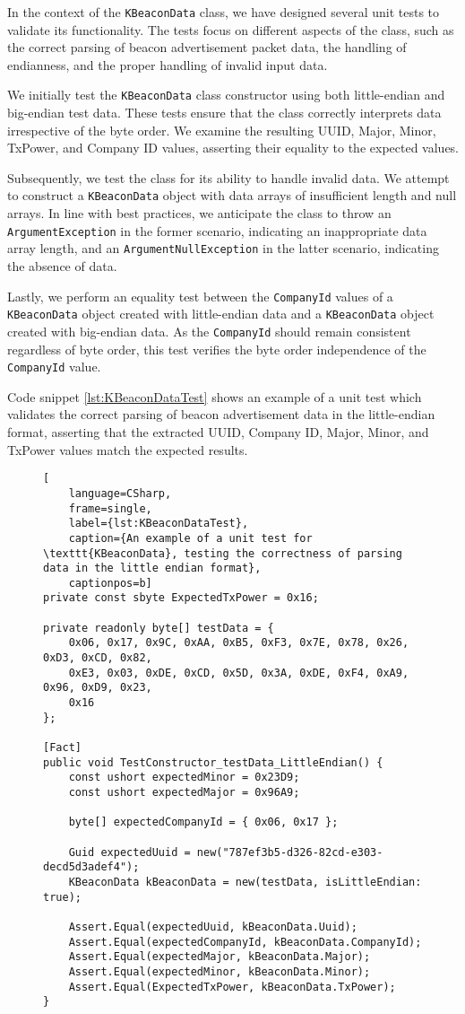 In the context of the \texttt{KBeaconData} class, we have designed several unit tests to validate its functionality. The tests focus on different aspects of the class, such as the correct parsing of beacon advertisement packet data, the handling of endianness, and the proper handling of invalid input data. 

We initially test the \texttt{KBeaconData} class constructor using both little-endian and big-endian test data. These tests ensure that the class correctly interprets data irrespective of the byte order. We examine the resulting UUID, Major, Minor, TxPower, and Company ID values, asserting their equality to the expected values.

Subsequently, we test the class for its ability to handle invalid data. We attempt to construct a \texttt{KBeaconData} object with data arrays of insufficient length and null arrays. In line with best practices, we anticipate the class to throw an \texttt{ArgumentException} in the former scenario, indicating an inappropriate data array length, and an \texttt{ArgumentNullException} in the latter scenario, indicating the absence of data.

Lastly, we perform an equality test between the \texttt{CompanyId} values of a \texttt{KBeaconData} object created with little-endian data and a \texttt{KBeaconData} object created with big-endian data. As the \texttt{CompanyId} should remain consistent regardless of byte order, this test verifies the byte order independence of the \texttt{CompanyId} value.

Code snippet \ref{lst:KBeaconDataTest} shows an example of a unit test which validates the correct parsing of beacon advertisement data in the little-endian format, asserting that the extracted UUID, Company ID, Major, Minor, and TxPower values match the expected results.

\begin{figure}[H]
\begin{lstlisting}[
	language=CSharp, 
	frame=single, 
	label={lst:KBeaconDataTest},
	caption={An example of a unit test for \texttt{KBeaconData}, testing the correctness of parsing data in the little endian format}, 
	captionpos=b] 
private const sbyte ExpectedTxPower = 0x16;
	
private readonly byte[] testData = { 
	0x06, 0x17, 0x9C, 0xAA, 0xB5, 0xF3, 0x7E, 0x78, 0x26, 0xD3, 0xCD, 0x82,
	0xE3, 0x03, 0xDE, 0xCD, 0x5D, 0x3A, 0xDE, 0xF4, 0xA9, 0x96, 0xD9, 0x23, 
	0x16 
};

[Fact]
public void TestConstructor_testData_LittleEndian() {
	const ushort expectedMinor = 0x23D9;
	const ushort expectedMajor = 0x96A9;

	byte[] expectedCompanyId = { 0x06, 0x17 };

	Guid expectedUuid = new("787ef3b5-d326-82cd-e303-decd5d3adef4");
	KBeaconData kBeaconData = new(testData, isLittleEndian: true);

	Assert.Equal(expectedUuid, kBeaconData.Uuid);
	Assert.Equal(expectedCompanyId, kBeaconData.CompanyId);
	Assert.Equal(expectedMajor, kBeaconData.Major);
	Assert.Equal(expectedMinor, kBeaconData.Minor);
	Assert.Equal(ExpectedTxPower, kBeaconData.TxPower);
}
\end{lstlisting}
\end{figure}
